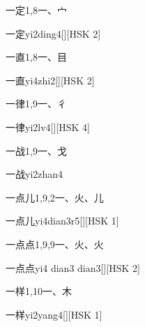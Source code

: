 \begin{entry}{一定}{1,8}{⼀、⼧}
  \begin{phonetics}{一定}{yi2ding4}[][HSK 2]
  \end{phonetics}
\end{entry}

\begin{entry}{一直}{1,8}{⼀、⽬}
  \begin{phonetics}{一直}{yi4zhi2}[][HSK 2]
  \end{phonetics}
\end{entry}

\begin{entry}{一律}{1,9}{⼀、⼻}
  \begin{phonetics}{一律}{yi2lv4}[][HSK 4]
  \end{phonetics}
\end{entry}

\begin{entry}{一战}{1,9}{⼀、⼽}
  \begin{phonetics}{一战}{yi2zhan4}
  \end{phonetics}
\end{entry}

\begin{entry}{一点儿}{1,9,2}{⼀、⽕、⼉}
  \begin{phonetics}{一点儿}{yi4dian3r5}[][HSK 1]
  \end{phonetics}
\end{entry}

\begin{entry}{一点点}{1,9,9}{⼀、⽕、⽕}
  \begin{phonetics}{一点点}{yi4 dian3 dian3}[][HSK 2]
  \end{phonetics}
\end{entry}

\begin{entry}{一样}{1,10}{⼀、⽊}
  \begin{phonetics}{一样}{yi2yang4}[][HSK 1]
  \end{phonetics}
\end{entry}

